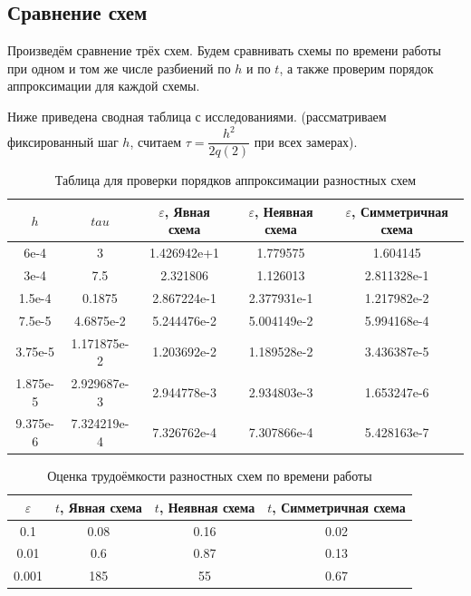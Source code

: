 \documentclass[12pt]{article}
\begin{document}
\subsection{Сравнение схем}
Произведём сравнение трёх схем. Будем сравнивать схемы по времени работы при одном и том же числе разбиений по $h$ и по $t$, а также проверим порядок аппроксимации для каждой схемы.

Ниже приведена сводная таблица с исследованиями. (рассматриваем фиксированный шаг $h$, считаем $\tau = \dfrac{h^2}{2q(2)}$ при всех замерах). 

\begin{table}[H]
\caption{Таблица для проверки порядков аппроксимации разностных схем}
\begin{center}
\begin{tabular}{|c|c|c|c|c|}
\hline
$h$ & $tau$ & $\varepsilon$, Явная схема & $\varepsilon$, Неявная схема & $\varepsilon$, Симметричная схема  \\
\hline
6e-4 & 3 & 1.426942e+1 & 1.779575 & 1.604145 \\
\hline
3e-4 & 7.5 & 2.321806 & 1.126013 & 2.811328e-1  \\
\hline
1.5e-4 & 0.1875 & 2.867224e-1 & 2.377931e-1 & 1.217982e-2 \\
\hline
7.5e-5 & 4.6875e-2 & 5.244476e-2 & 5.004149e-2 & 5.994168e-4 \\ 
\hline
3.75e-5 & 1.171875e-2 & 1.203692e-2 & 1.189528e-2 & 3.436387e-5 \\
\hline
1.875e-5 & 2.929687e-3 & 2.944778e-3 & 2.934803e-3 & 1.653247e-6 \\
\hline
9.375e-6 & 7.324219e-4 & 7.326762e-4 & 7.307866e-4 & 5.428163e-7 \\
\hline
\end{tabular}
\end{center}
\end{table}

\begin{table}[H]
\caption{Оценка трудоёмкости разностных схем по времени работы}
\begin{center}
\begin{tabular}{|c|c|c|c|}
\hline
$\varepsilon$ & $t$, Явная схема & $t$, Неявная схема & $t$, Симметричная схема  \\
\hline
0.1 & 0.08 & 0.16 & 0.02 \\
\hline
0.01 & 0.6 & 0.87 & 0.13\\
\hline
0.001 & 185 & 55 & 0.67\\
\hline
\end{tabular}
\end{center}
\end{table}
\end{document}

